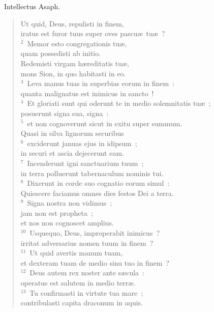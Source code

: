 ~\lettrine[lines=10,image=true,loversize=0.05,lraise=-0.03]{I}{}ntellectus Asaph. \begin{flushleft}\begin{verse}\vspace{6pt}Ut quid, Deus, repulisti in finem,\\ iratus est furor tuus super oves pascu\ae\ tu\ae~?\\
${}^{2}$~Memor esto congregationis tu\ae ,\\ quam possedisti ab initio.\\ Redemisti virgam h\ae reditatis tu\ae ,\\ mons Sion, in quo habitasti in eo.\\
${}^{3}$~Leva manus tuas in superbias eorum in finem~:\\ quanta malignatus est inimicus in sancto~!\\
${}^{4}$~Et gloriati sunt qui oderunt te in medio solemnitatis tu\ae~;\\ posuerunt signa sua, signa~:\\
${}^{5}$~et non cognoverunt sicut in exitu super summum.\\ Quasi in silva lignorum securibus\\
${}^{6}$~exciderunt januas ejus in idipsum~;\\ in securi et ascia dejecerunt eam.\\
${}^{7}$~Incenderunt igni sanctuarium tuum~;\\ in terra polluerunt tabernaculum nominis tui.\\
${}^{8}$~Dixerunt in corde suo cognatio eorum simul~:\\ Quiescere faciamus omnes dies festos Dei a terra.\\
${}^{9}$~Signa nostra non vidimus~;\\ jam non est propheta~;\\ et nos non cognoscet amplius.\\
${}^{10}$~Usquequo, Deus, improperabit inimicus~?\\ irritat adversarius nomen tuum in finem~?\\
${}^{11}$~Ut quid avertis manum tuam,\\ et dexteram tuam de medio sinu tuo in finem~?\\
${}^{12}$~Deus autem rex noster ante s\ae cula~:\\ operatus est salutem in medio terr\ae .\\
${}^{13}$~Tu confirmasti in virtute tua mare~;\\ contribulasti capita draconum in aquis.\\

\end{verse}
\end{flushleft}

